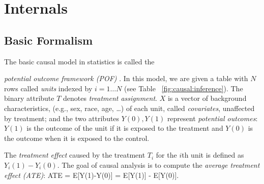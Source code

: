 \vspace{-.2cm}
\section{Internals}
\subsection{Basic Formalism}

The basic causal model in statistics is called the
{\em potential outcome framework (POF)} \cite{Rubin2005,holland1986statistics}.
In this model, we are given a table with $N$ rows called {\em units} indexed by $i=1 \ldots N$ (see
Table~ \ref{fig:causal:inference}).  The binary attribute $T$ denotes {\em treatment assignment}.
$X$ is a vector of
background characteristics, (e.g., sex, race, age, \ldots) of each unit,
called {\em covariates}, unaffected by treatment; and the two
attributes $Y(0), Y(1)$ represent {\em potential outcomes}: $Y(1)$ is
the outcome of the unit if it is exposed to the treatment and $Y(0)$
is the outcome when it is exposed to the control.

The {\em treatment effect}
caused by the treatment $T_i$ for the $i$th unit  is defined as $Y_i(1)-Y_i(0)$.
The goal of causal analysis is to compute the {\em average treatment
  effect (ATE)}:   ATE = E[Y(1)-Y(0)] = E[Y(1)] - E[Y(0)].


